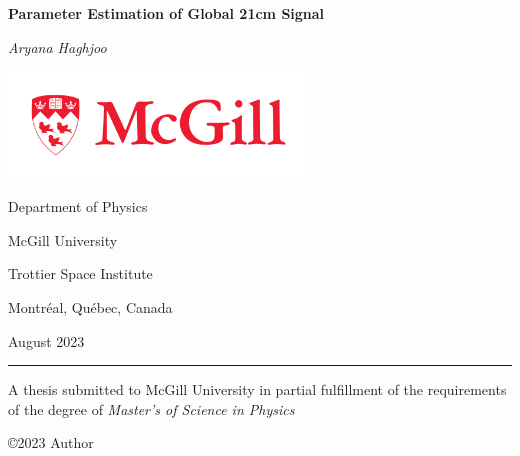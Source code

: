 \documentclass[12pt, TexShade, letterpaper]{report}
\author{\textcopyright Author, August, 2020}
\date{}
\renewcommand{\chaptermark}[1]{\markboth{#1}{}} %
\begin{document}
\begin{titlepage}
		\begin{center}
			\vspace*{0.5cm}

			\LARGE
			\textbf{Parameter Estimation of Global 21cm Signal}
			\vspace{1cm}
			
			\textit{Aryana Haghjoo}
			
			\vspace{1cm}
			
			\includegraphics[width=0.6\textwidth]{McGill_logo.png}
			
			\vspace{1cm}
			
			\Large
			Department of Physics
			
			\vspace{-5mm}
			McGill University
			
			\vspace{-5mm}
			Trottier Space Institute
			
			\vspace{-5mm}
			Montr\'eal, Qu\'ebec, Canada
			
			\vspace{5mm}
			August 2023
			\small
			\vspace{0.5cm}
			{\color{red} \hrule height 0.75mm}
			
			\vspace{0.2cm}
			
			A thesis submitted to McGill University in partial fulfillment of the requirements of the degree of
			\emph{Master's of Science in Physics}
		
			\copyright\hspace{0.5mm}2023 Author
			
		\end{center}
	\end{titlepage}
\setlength{\voffset}{2cm}
\renewcommand{\chaptermark}[1]{%
	\markboth{\thechapter.\ #1}{}}
\end{document}
